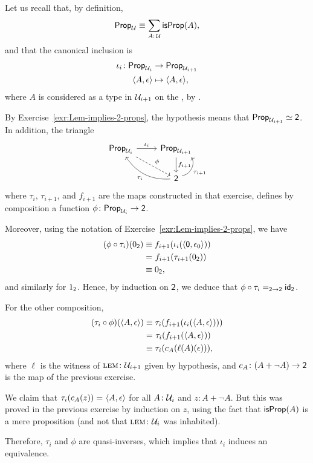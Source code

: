 \begin{solution}
    Let us recall that, by definition,
    \[
        \fun{Prop}_\univ\equiv\sum_{A\colon\univ}\fun{isProp}(A),
    \]
    and that the canonical inclusion is
    \begin{align*}
        \iota_i\colon\fun{Prop}_{\univ_i}
            &\to\fun{Prop}_{\univ_{i+1}}\\
        \dep{A,\epsilon}&\mapsto\dep{A,\epsilon},
    \end{align*}
    where $A$ is considered as a type in $\mathcal U_{i+1}$ on the \rhs, by \textsc{}.
    
    By Exercise~\ref{exr:Lem-implies-2-props}, the hypothesis means that $\mathsf{Prop}_{\mathcal U_{i+1}}\simeq\mathsf{2}$. In addition, the triangle
    \[
        \begin{tikzcd}
            \fun{Prop}_{\univ_i}
                    \arrow[r,"\iota_i"]
                    \arrow[rd,dashed,"\phi"]
                &\fun{Prop}_{\univ_{i+1}}
                    \arrow[d,"f_{i+1}"]\\
                &\fun2
                    \arrow[lu,"\tau_i",bend left]
                    \arrow[u,"\tau_{i+1}"',bend right=60]
        \end{tikzcd}
    \]
    where $\tau_i$, $\tau_{i+1}$, and $f_{i+1}$ are the maps constructed in that exercise, defines by composition a function $\phi\colon\fun{Prop}_{\univ_i}\to\fun2$.

    Moreover, using the notation of Exercise~\ref{exr:Lem-implies-2-props}, we have
    \begin{align*}
        (\phi\circ\tau_i)(0_{\mathsf{2}})
            &\equiv f_{i+1}(\iota_i(\langle\mathsf{0},\epsilon_0\rangle))\\
            &\mathrel{=_{}} f_{i+1}(\tau_{i+1}(0_{\mathsf{2}}))\\
            &\equiv 0_{\mathsf{2}},
    \end{align*}
    and similarly for $1_{\mathsf{2}}$. Hence, by induction on $\mathsf{2}$, we deduce that $\phi\circ\tau_i\mathrel{=_{\mathsf{2}\to\mathsf{2}}}\mathsf{id}_{\mathsf{2}}$.

    For the other composition,
    \begin{align*}
        (\tau_i\circ\phi)(\langle A,\epsilon\rangle)
            &\equiv
                \tau_i(f_{i+1}(\iota_i(\langle A,\epsilon\rangle)))\\
            &\mathrel{=_{}}\tau_i(f_{i+1}(\langle A,\epsilon\rangle))\\
            &\equiv\tau_i(c_A(\ell(A)(\epsilon))),
    \end{align*}
    where $\ell$ is the witness of $\Lem\colon\univ_{i+1}$ given by hypothesis, and $c_A\colon(A+\neg A)\to\fun2$ is the map of the previous exercise.

    We claim that $\tau_i(c_A(z))\mathrel{=_{}}\langle A,\epsilon\rangle$ for all $A\colon\univ_i$ and $z\colon A+\neg A$. But this was proved in the previous exercise by induction on $z$, using the fact that $\mathsf{isProp}(A)$ is a mere proposition (and not that $\Lem\colon\univ_i$ was inhabited).

    Therefore, $\tau_i$ and $\phi$ are quasi-inverses, which implies that $\iota_i$ induces an equivalence.
    
\end{solution}

